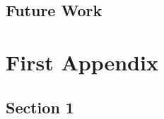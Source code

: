   \section{Future Work}\label{sec:FutureWork}
    \lipsum[38]\cite{TEST}
	
  \printreferences 


\bigskip 
\clearpage

 \singlespacing                %
 
\printbibliography[heading=bibintoc]
\bigskip

\appendix
 \truedoublespacing            %

\chapter{First Appendix}\label{app:App1}
  \section{Section 1}\label{sec:App1Sec1}
    \lipsum[34-36]
